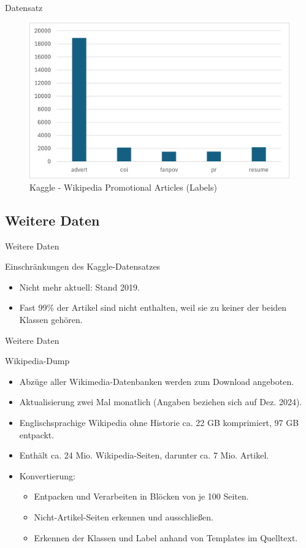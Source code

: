 \documentclass[aspectratio=169]{beamer} %
\begin{document}
\begin{frame}{Datensatz}
    \begin{figure}
        \centering
        \includegraphics[width=0.6\linewidth]{figures/kaggle-promo-labels.png}
        \caption{Kaggle - Wikipedia Promotional Articles (Labels)}
    \end{figure}
\end{frame}

\subsection{Weitere Daten}

\begin{frame}{Weitere Daten}
    \begin{block}{Einschränkungen des Kaggle-Datensatzes}
        \begin{itemize}
            \item Nicht mehr aktuell: Stand 2019.
            \item Fast 99\% der Artikel sind nicht enthalten, weil sie zu keiner der beiden Klassen gehören.
        \end{itemize}
    \end{block}
\end{frame}

\begin{frame}{Weitere Daten}
    \begin{block}{Wikipedia-Dump}
        \begin{itemize}
            \item Abzüge aller Wikimedia-Datenbanken werden zum Download angeboten.
            \item Aktualisierung zwei Mal monatlich (Angaben beziehen sich auf Dez. 2024).
            \item Englischsprachige Wikipedia ohne Historie ca. 22 GB komprimiert, 97 GB entpackt.
            \item Enthält ca. 24 Mio. Wikipedia-Seiten, darunter ca. 7 Mio. Artikel.
            \item Konvertierung:
            \begin{itemize}
                \item Entpacken und Verarbeiten in Blöcken von je 100 Seiten.
                \item Nicht-Artikel-Seiten erkennen und ausschließen.
                \item Erkennen der Klassen und Label anhand von Templates im Quelltext.
            \end{itemize}
        \end{itemize}
    \end{block}
\end{frame}
\end{document}
